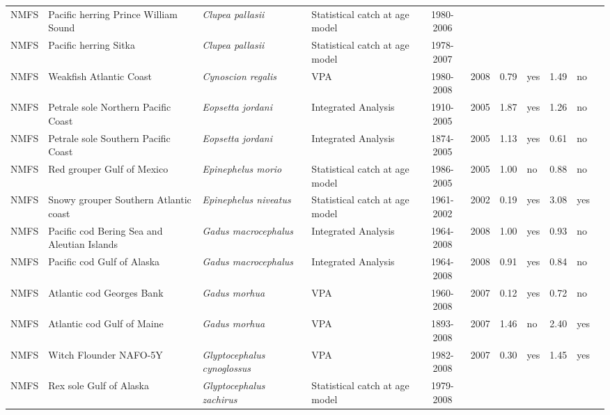 \begin{longtable}{p{1.8cm}p{3.5cm}p{3.5cm}p{3cm}cccp{0.9cm}cp{0.9cm}c}
  NMFS & Pacific herring Prince William Sound & \textit{Clupea pallasii} & Statistical catch at age model & 1980-2006 &  &  &  &  &  & \cite{NA} \\ 
  NMFS & Pacific herring Sitka & \textit{Clupea pallasii} & Statistical catch at age model & 1978-2007 &  &  &  &  &  & \cite{NA} \\ 
  NMFS & Weakfish Atlantic Coast & \textit{Cynoscion regalis} & VPA & 1980-2008 & 2008 & 0.79 & yes & 1.49 & no & \cite{NEFSC-Weakfish-2009.pdf} \\ 
  NMFS & Petrale sole Northern Pacific Coast & \textit{Eopsetta jordani} & Integrated Analysis & 1910-2005 & 2005 & 1.87 & yes & 1.26 & no & \cite{2004_SAFE_WCpetralesole.pdf} \\ 
  NMFS & Petrale sole Southern Pacific Coast & \textit{Eopsetta jordani} & Integrated Analysis & 1874-2005 & 2005 & 1.13 & yes & 0.61 & no & \cite{2004-SAFE-WCpetralesole.pdf} \\ 
  NMFS & Red grouper Gulf of Mexico & \textit{Epinephelus morio} & Statistical catch at age model & 1986-2005 & 2005 & 1.00 & no & 0.88 & no & \cite{JENSEN_RGROUPGM-2006.pdf} \\ 
  NMFS & Snowy grouper Southern Atlantic coast & \textit{Epinephelus niveatus} & Statistical catch at age model & 1961-2002 & 2002 & 0.19 & yes & 3.08 & yes & \cite{2004-SEDAR-deepwatersnappergrouper.pdf} \\ 
  NMFS & Pacific cod Bering Sea and Aleutian Islands & \textit{Gadus macrocephalus} & Integrated Analysis & 1964-2008 & 2008 & 1.00 & yes & 0.93 & no & \cite{AFSC-PCODBSAI-2008-Pacific cod BSAI.pdf} \\ 
  NMFS & Pacific cod Gulf of Alaska & \textit{Gadus macrocephalus} & Integrated Analysis & 1964-2008 & 2008 & 0.91 & yes & 0.84 & no & \cite{AFSC-PCODGA-2008-Pacific cod GA.pdf} \\ 
  NMFS & Atlantic cod Georges Bank & \textit{Gadus morhua} & VPA & 1960-2008 & 2007 & 0.12 & yes & 0.72 & no & \cite{NMFS-GB-Gadusmorhua-2008.pdf} \\ 
  NMFS & Atlantic cod Gulf of Maine & \textit{Gadus morhua} & VPA & 1893-2008 & 2007 & 1.46 & no & 2.40 & yes & \cite{NMFS-GOM-Gadusmorhua-2008.pdf} \\ 
  NMFS & Witch Flounder NAFO-5Y & \textit{Glyptocephalus cynoglossus} & VPA & 1982-2008 & 2007 & 0.30 & yes & 1.45 & yes & \cite{NA} \\ 
  NMFS & Rex sole Gulf of Alaska & \textit{Glyptocephalus zachirus} & Statistical catch at age model & 1979-2008 &  &  &  &  &  & \cite{2008_SAFE_GOArex.pdf} \\ 

\end{longtable}
